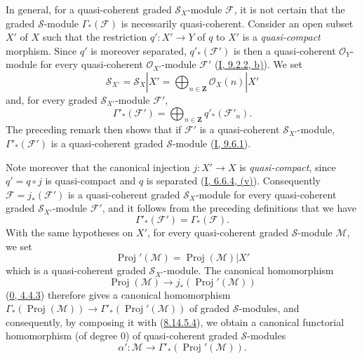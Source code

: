 \begin{env}[8.14.6]
\label{II.8.14.6}
In general, for a quasi-coherent graded $\mathcal{S}_X$-module
$\mathcal{F}$, it is not certain that the graded $\mathcal{S}$-module
$\Gamma_*(\mathcal{F})$ is necessarily quasi-coherent. Consider an
open subset $X'$ of $X$ such that the restriction $q':X'\to Y$ of $q$ to $X'$
is a \emph{quasi-compact} morphism. Since $q'$ is moreover separated,
$q'_*(\mathcal{F}')$ is then a quasi-coherent $\mathcal{O}_Y$-module for
every quasi-coherent $\mathcal{O}_{X'}$-module $\mathcal{F}'$
(\hyperref[I.9.2.2]{I, 9.2.2, b)}). We set
\begin{equation}
\label{II.8.14.6.1}
  \mathcal{S}_{X'}=\mathcal{S}_X|X'
  =\bigoplus_{n\in\mathbf{Z}}\mathcal{O}_X(n)|X'
\tag{8.14.6.1}
\end{equation}
and, for every graded $\mathcal{S}_{X'}$-module $\mathcal{F}'$,
\begin{equation}
\label{II.8.14.6.2}
  \Gamma'_*(\mathcal{F}')=
  \bigoplus_{n\in\mathbf{Z}}q'_*(\mathcal{F}'_n).
\tag{8.14.6.2}
\end{equation}
The preceding remark then shows that if $\mathcal{F}'$ is a
quasi-coherent $\mathcal{S}_{X'}$-module, $\Gamma'_*(\mathcal{F}')$ is a
quasi-coherent graded $\mathcal{S}$-module
(\hyperref[I.9.6.1]{I, 9.6.1}).

Note moreover that the canonical injection $j:X'\to X$ is
\emph{quasi-compact}, since $q'=q\circ j$ is quasi-compact and $q$ is separated
(\hyperref[I.6.6.4]{I, 6.6.4, (v)}). Consequently
$\mathcal{F}=j_*(\mathcal{F}')$ is a quasi-coherent graded
$\mathcal{S}_X$-module for every quasi-coherent graded
$\mathcal{S}_{X'}$-module $\mathcal{F}'$, and it follows from the preceding
definitions that we have
\begin{equation}
\label{II.8.14.6.3}
  \Gamma'_*(\mathcal{F}')=\Gamma_*(\mathcal{F}).
\tag{8.14.6.3}
\end{equation}
With the same hypotheses on $X'$, for every quasi-coherent graded
$\mathcal{S}$-module $\mathcal{M}$, we set
\begin{equation}
\label{II.8.14.6.4}
  \operatorname{Proj}'(\mathcal{M})
  =\operatorname{Proj}(\mathcal{M})|X'
\tag{8.14.6.4}
\end{equation}
which is a quasi-coherent graded $\mathcal{S}_{X'}$-module. The canonical
homomorphism
\[
  \operatorname{Proj}(\mathcal{M})\to
  j_*(\operatorname{Proj}'(\mathcal{M}))
\]
(\hyperref[0.4.4.3]{0, 4.4.3}) therefore gives a canonical homomorphism
$\Gamma_*(\operatorname{Proj}(\mathcal{M}))\to
\Gamma'_*(\operatorname{Proj}'(\mathcal{M}))$ of graded
$\mathcal{S}$-modules, and consequently, by composing it with
(\hyperref[II.8.14.5.4]{8.14.5.4}), we obtain a canonical functorial
homomorphism (of degree $0$) of quasi-coherent graded $\mathcal{S}$-modules
\begin{equation}
\label{II.8.14.6.5}
  \alpha':\mathcal{M}\to
  \Gamma'_*(\operatorname{Proj}'(\mathcal{M})).
\tag{8.14.6.5}
\end{equation}
\end{env}

